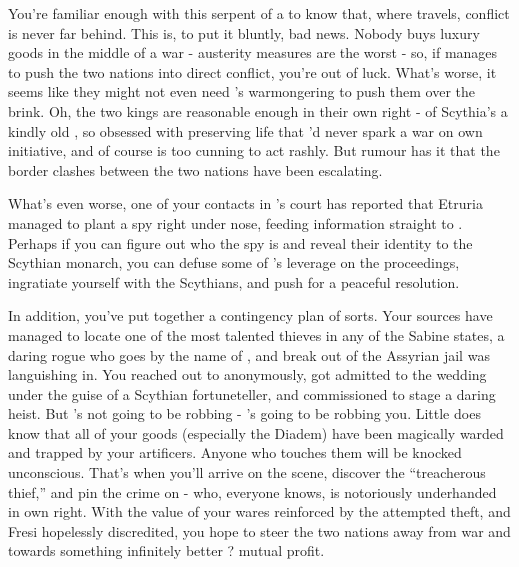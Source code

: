 \documentclass[char]{Kos}
\begin{document}
You're familiar enough with this serpent of a \cArmsDealer{\human} to know that, where \cArmsDealer{\they} travels, conflict is never far behind. This is, to put it bluntly, bad news. Nobody buys luxury goods in the middle of a war - austerity measures are the worst - so, if \cArmsDealer{} manages to push the two nations into direct conflict, you're out of luck. What's worse, it seems like they might not even need \cArmsDealer{}'s warmongering to push them over the brink. Oh, the two kings are reasonable enough in their own right - \cScythiaKing{} of Scythia's a kindly old \cScythiaKing{\human}, so obsessed with preserving life that \cScythiaKing{\they}'d never spark a war on \cScythiaKing{\their} own initiative, and \cEtruriaKing{} of course is too cunning to act rashly. But rumour has it that the border clashes between the two nations have been escalating. 

What's even worse, one of your contacts in \cScythiaKing{\Monarch} \cScythiaKing{}'s court has reported that Etruria managed to plant a spy right under \cScythiaKing{\their} nose, feeding information straight to \cEtruriaKing{}. Perhaps if you can figure out who the spy is and reveal their identity to the Scythian monarch, you can defuse some of \cEtruriaKing{}'s leverage on the proceedings, ingratiate yourself with the Scythians, and push for a peaceful resolution.

In addition, you've put together a contingency plan of sorts. Your sources have managed to locate one of the most talented thieves in any of the Sabine states, a daring rogue who goes by the name of \cBurglar{}, and break \cBurglar{\them} out of the Assyrian jail \cBurglar{\they} was languishing in. You reached out to \cBurglar{\them} anonymously, got \cBurglar{\them} admitted to the wedding under the guise of a Scythian fortuneteller, and commissioned \cBurglar{\them} to stage a daring heist. But \cBurglar{\they}'s not going to be robbing \cArmsDealer{} - \cBurglar{\they}'s going to be robbing you. Little does \cBurglar{\they} know that all of your goods (especially the Diadem) have been magically warded and trapped by your artificers. Anyone who touches them will be knocked unconscious. That's when you'll arrive on the scene, discover the ``treacherous thief,'' and pin the crime on \cArmsDealer{} - who, everyone knows, is notoriously underhanded in \cArmsDealer{\their} own right. With the value of your wares reinforced by the attempted theft, and Fresi hopelessly discredited, you hope to steer the two nations away from war and towards something infinitely better ? mutual profit.
\end{document}
